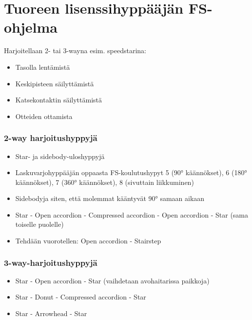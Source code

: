 \section{ Tuoreen lisenssihyppääjän FS-ohjelma }
\label{tuoreen-lisenssihyppaajan-fs-ohjelma-tuoreen-lisenssihyppaajan-fs-ohjelma}


Harjoitellaan 2- tai 3-wayna esim. speedstarina: 

\begin{itemize}
\item  Tasolla lentämistä 
\item  Keskipisteen säilyttämistä   
\item  Katsekontaktin säilyttämistä 
\item  Otteiden ottamista 
\end{itemize}
\subsubsection{ 2-way harjoitushyppyjä }
\label{tuoreen-lisenssihyppaajan-fs-ohjelma-2-way-harjoitushyppyja}

\begin{itemize}
\item  Star- ja sidebody-uloshyppyjä 
\item  Laskuvarjohyppääjän oppaasta FS-koulutushypyt 5 (90° käännökset), 6 (180° käännökset), 7 (360° käännökset), 8 (sivuttain liikkuminen) 
\item  Sidebodyja siten, että molemmat kääntyvät 90° samaan aikaan 
\item  Star - Open accordion - Compressed accordion - Open accordion - Star (sama toiselle puolelle) 
\item  Tehdään vuorotellen: Open accordion - Stairstep 
\end{itemize}
\subsubsection{ 3-way-harjoitushyppyjä }
\label{tuoreen-lisenssihyppaajan-fs-ohjelma-3-way-harjoitushyppyja}

\begin{itemize}
\item  Star - Open accordion - Star (vaihdetaan avohaitarissa paikkoja) 
\item  Star - Donut - Compressed accordion - Star 
\item  Star - Arrowhead - Star 
\end{itemize}

